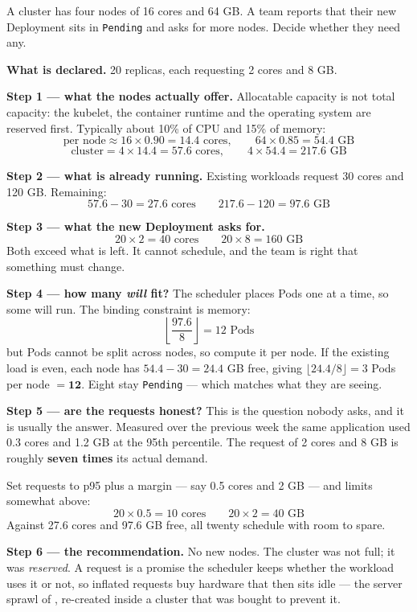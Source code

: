 \begin{worked}
A cluster has four nodes of 16 cores and 64 GB. A team reports that their new
Deployment sits in \texttt{Pending} and asks for more nodes. Decide whether
they need any.

\smallskip
\textbf{What is declared.} 20 replicas, each requesting 2 cores and 8 GB.

\smallskip
\textbf{Step 1 --- what the nodes actually offer.} Allocatable capacity is not
total capacity: the kubelet, the container runtime and the operating system are
reserved first. Typically about 10\% of CPU and 15\% of memory:
\[ \text{per node} \approx 16 \times 0.90 = 14.4 \text{ cores}, \qquad
   64 \times 0.85 = 54.4 \text{ GB} \]
\[ \text{cluster} = 4 \times 14.4 = 57.6 \text{ cores}, \qquad
   4 \times 54.4 = 217.6 \text{ GB} \]

\smallskip
\textbf{Step 2 --- what is already running.} Existing workloads request 30
cores and 120 GB. Remaining:
\[ 57.6 - 30 = 27.6 \text{ cores} \qquad 217.6 - 120 = 97.6 \text{ GB} \]

\smallskip
\textbf{Step 3 --- what the new Deployment asks for.}
\[ 20 \times 2 = 40 \text{ cores} \qquad 20 \times 8 = 160 \text{ GB} \]
Both exceed what is left. It cannot schedule, and the team is right that
something must change.

\smallskip
\textbf{Step 4 --- how many \emph{will} fit?} The scheduler places Pods one at
a time, so some will run. The binding constraint is memory:
\[ \left\lfloor \frac{97.6}{8} \right\rfloor = 12 \text{ Pods} \]
but Pods cannot be split across nodes, so compute it per node. If the existing
load is even, each node has $54.4 - 30 = 24.4$ GB free, giving
$\lfloor 24.4/8 \rfloor = 3$ Pods per node $= \mathbf{12}$. Eight stay
\texttt{Pending} --- which matches what they are seeing.

\smallskip
\textbf{Step 5 --- are the requests honest?} This is the question nobody asks,
and it is usually the answer. Measured over the previous week the same
application used 0.3 cores and 1.2 GB at the 95th percentile. The request of 2
cores and 8 GB is roughly \textbf{seven times} its actual demand.

\smallskip
Set requests to p95 plus a margin --- say 0.5 cores and 2 GB --- and limits
somewhat above:
\[ 20 \times 0.5 = 10 \text{ cores} \qquad 20 \times 2 = 40 \text{ GB} \]
Against 27.6 cores and 97.6 GB free, all twenty schedule with room to spare.

\smallskip
\textbf{Step 6 --- the recommendation.} No new nodes. The cluster was not full;
it was \emph{reserved}. A request is a promise the scheduler keeps whether the
workload uses it or not, so inflated requests buy hardware that then sits idle
--- the server sprawl of , re-created inside a cluster that was
bought to prevent it.
\end{worked}

